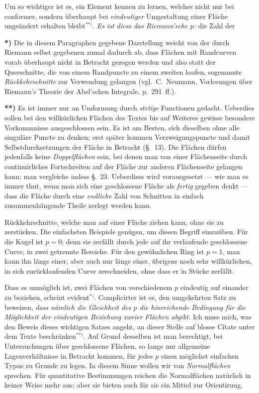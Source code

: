 \documentclass{article}
\begin{document}
Um so wichtiger ist es, ein Element kennen zu lernen, welches nicht nur bei conformer, sondern überhaupt bei \emph{eindeutiger} Umgestaltung einer Fläche ungeändert erhalten bleibt${}^{**)}$. \emph{Es ist diess das Riemann'sche $p$:} die Zahl der

\textbf{*)} Die in diesem Paragraphen gegebene Darstellung weicht von der durch Riemann selbst gegebenen zumal dadurch ab, dass Flächen mit Randcurven vorab überhaupt nicht in Betracht gezogen werden und also statt der Querschnitte, die von einem Randpuncte zu einem zweiten laufen, sogenannte \emph{Rückkehrschnitte} zur Verwendung gelangen (vgl.\ C.\ Neumann, Vorlesungen über Riemann's Theorie der Abel'schen Integrale, p.~291~ff.).

\textbf{**)} Es ist immer nur an Umformung durch \emph{stetige} Functionen gedacht. Ueberdies sollen bei den willkürlichen Flächen des Textes bis auf Weiteres gewisse besondere Vorkommnisse ausgeschlossen sein. Es ist am Besten, sich dieselben ohne alle singuläre Puncte zu denken; erst später kommen Verzweigungspuncte und damit Selbstdurchsetzungen der Fläche in Betracht (§.~13). Die Flächen dürfen jedenfalls keine \emph{Doppelflächen} sein, bei denen man von einer Flächenseite durch continuirliches Fortschreiten auf der Fläche zur anderen Flächenseite gelangen kann; man vergleiche indess §.~23. Ueberdiess wird vorausgesetzt --- wie man es immer thut, wenn man sich eine geschlossene Fläche als \emph{fertig} gegeben denkt --- dass die Fläche durch eine \emph{endliche} Zahl von Schnitten in einfach zusammenhängende Theile zerlegt werden kann.

Rückkehrschnitte, welche man auf einer Fläche ziehen kann, ohne sie zu zerstücken. Die einfachsten Beispiele genügen, um diesen Begriff einzuüben. Für die Kugel ist $p = 0$; denn sie zerfällt durch jede auf ihr verlaufende geschlossene Curve, in zwei getrennte Bereiche. Für den gewöhnlichen Ring ist $p = 1$, man kann ihn längs einer, aber auch nur längs einer, übrigens noch sehr willkürlichen, in sich zurücklaufenden Curve zerschneiden, ohne dass er in Stücke zerfällt.

Dass es unmöglich ist, zwei Flächen von verschiedenem $p$ eindeutig auf einander zu beziehen, scheint evident${}^{*)}$. Complicirter ist es, den umgekehrten Satz zu beweisen, \emph{dass nämlich die Gleichheit des $p$ die hinreichende Bedingung für die Möglichkeit der eindeutigen Beziehung zweier Flächen abgibt.} Ich muss mich, was den Beweis dieses wichtigen Satzes angeht, an dieser Stelle auf blosse Citate unter dem Texte beschränken${}^{**)}$. Auf Grund desselben ist man berechtigt, bei Untersuchungen über geschlossene Flächen, so lange nur allgemeine Lagenverhältnisse in Betracht kommen, für jedes $p$ einen möglichst einfachen Typus zu Grunde zu legen. In diesem Sinne wollen wir von \emph{Normalflächen} sprechen. Für quantitative Bestimmungen reichen die Normalflächen natürlich in keiner Weise mehr aus; aber sie bieten auch für sie ein Mittel zur Orientirung.
\end{document}
